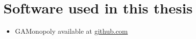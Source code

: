 \clearpage
\newpage
\chapter{Software used in this thesis}
\label{sec:appendixA}

\begin{itemize}%
  \item{GAMonopoly available at \url{github.com}}
\end{itemize}
